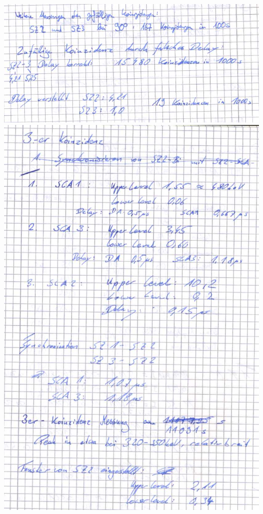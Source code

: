 \clearpage
\includegraphics[scale=0.55]{Messprotokoll/0008.jpeg}
\clearpage
\includegraphics[scale=0.55]{Messprotokoll/0009.jpeg}
\clearpage
